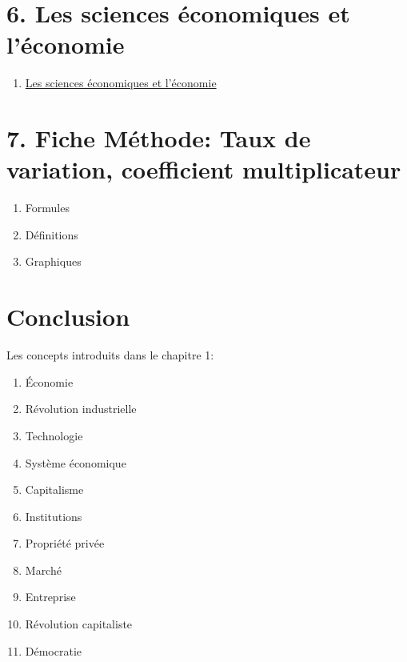 \documentclass[11pt]{amsart}
\begin{document}
\hypertarget{x-6.-les-sciences-économiques-et-l’économie}{\section*{6. Les sciences économiques et l’économie}}
\begin{enumerate}

\item{\href{https://www.core-econ.org/the-economy/book/fr/text/01.html#111-les-sciences-%C3%A9conomiques-et-l%C3%A9conomie}{Les sciences économiques et l’économie}}

\end{enumerate}


\hypertarget{x-7.-fiche-méthode:-taux-de-variation,-coefficient-multiplicateur}{\section*{7. Fiche Méthode: Taux de variation, coefficient multiplicateur}}
\begin{enumerate}

\item{Formules}

\item{Définitions}

\item{Graphiques}

\end{enumerate}


\hypertarget{x-conclusion}{\section*{Conclusion}}
Les concepts introduits dans le chapitre 1:


\begin{enumerate}

\item{Économie}

\item{Révolution industrielle}

\item{Technologie}

\item{Système économique}

\item{Capitalisme}

\item{Institutions}

\item{Propriété privée}

\item{Marché}

\item{Entreprise}

\item{Révolution capitaliste}

\item{Démocratie}

\end{enumerate}
\end{document}
